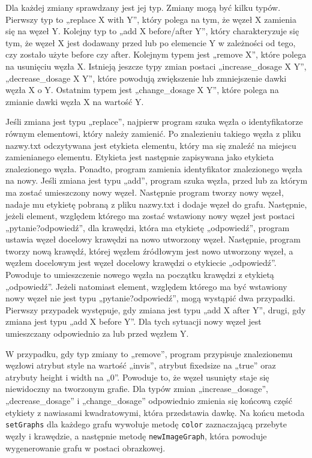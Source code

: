 Dla każdej zmiany sprawdzany jest jej typ. Zmiany mogą być kilku typów. Pierwszy typ to „replace X with Y”, który polega na tym, że węzeł X zamienia się na węzeł Y. Kolejny typ to „add X before/after Y”, który charakteryzuje się tym, że węzeł X jest dodawany przed lub po elemencie Y w zależności od tego, czy zostało użyte before czy after. Kolejnym typem jest „remove X”, które polega na usunięciu węzła X. Istnieją jeszcze typy zmian postaci „increase\_dosage X Y”, „decrease\_dosage X Y”, które powodują zwiększenie lub zmniejszenie dawki węzła X o Y. Ostatnim typem jest „change\_dosage X Y”, które polega na zmianie dawki węzła X na wartość Y.  

Jeśli zmiana jest typu „replace”, najpierw program szuka węzła o identyfikatorze równym elementowi, który należy zamienić. Po znalezieniu takiego węzła z pliku nazwy.txt odczytywana jest etykieta elementu, który ma się znaleźć na miejscu zamienianego elementu. Etykieta jest następnie zapisywana jako etykieta znalezionego węzła. Ponadto, program zamienia identyfikator znalezionego węzła na nowy. Jeśli zmiana jest typu „add”, program szuka węzła, przed lub za którym ma zostać umieszczony nowy węzeł. Następnie program tworzy nowy węzeł, nadaje mu etykietę pobraną z pliku nazwy.txt i dodaje węzeł do grafu. Następnie, jeżeli element, względem którego ma zostać wstawiony nowy węzeł jest postaci „pytanie?odpowiedź”, dla krawędzi, która ma etykietę „odpowiedź”, program ustawia węzeł docelowy krawędzi na nowo utworzony węzeł. Następnie, program tworzy nową krawędź, której węzłem źródłowym jest nowo utworzony węzeł, a węzłem docelowym jest węzeł docelowy krawędzi o etykiecie „odpowiedź”. Powoduje to umieszczenie nowego węzła na początku krawędzi z etykietą „odpowiedź”. Jeżeli natomiast element, względem którego ma być wstawiony nowy węzeł nie jest typu „pytanie?odpowiedź”, mogą wystąpić dwa przypadki. Pierwszy przypadek występuje, gdy zmiana jest typu „add X after Y”, drugi, gdy zmiana jest typu „add X before Y”. Dla tych sytuacji nowy węzeł jest umieszczany odpowiednio za lub przed węzłem Y. 

W przypadku, gdy typ zmiany to „remove”, program przypisuje znalezionemu węzłowi atrybut style na wartość „invis”, atrybut fixedsize na „true” oraz atrybuty height i width na „0”. Powoduje to, że węzeł usunięty staje się niewidoczny na tworzonym grafie. Dla typów zmian „increase\_dosage”, „decrease\_dosage” i „change\_dosage” odpowiednio zmienia się końcową część etykiety z nawiasami kwadratowymi, która przedstawia dawkę. Na końcu metoda \texttt{setGraphs} dla każdego grafu wywołuje metodę \texttt{color} zaznaczającą przebyte węzły i krawędzie, a następnie metodę \texttt{newImageGraph}, która powoduje wygenerowanie grafu w postaci obrazkowej. 

